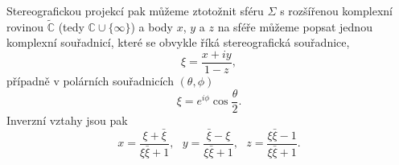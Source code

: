 Stereografickou projekcí pak můžeme ztotožnit sféru $\Sigma$ s rozšířenou komplexní rovinou $\tilde{\mathbb{C}}$
(tedy $\mathbb{C} \cup \{\infty\}$) a body $x$, $y$ a $z$ na sféře můžeme popsat jednou komplexní souřadnicí,
které se obvykle říká stereografická souřadnice,
\begin{equation}
    \xi = \frac{x + iy}{1-z},
\end{equation}
případně v polárních souřadnicích $(\theta, \phi)$
\begin{equation}
    \xi = e^{i \phi} \cos \frac{\theta}{2}.
\end{equation}
Inverzní vztahy jsou pak
\begin{equation}
    x=\frac{\xi+\bar{\xi}}{\xi \bar{\xi}+1},~~~y=\frac{\bar{\xi}-\xi}{\xi \bar{\xi}+1},~~~z=\frac{\xi\bar{\xi}-1}{\xi\bar{\xi}+1}.
\end{equation}

